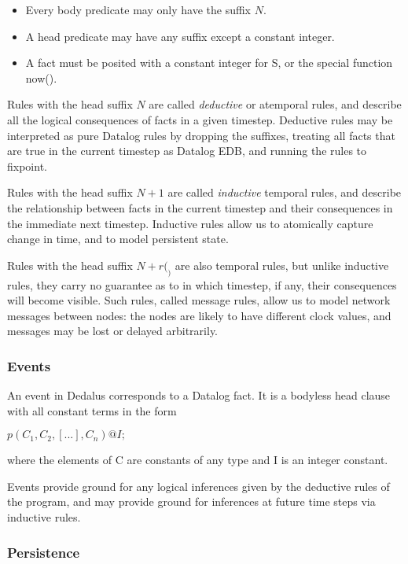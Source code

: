 \begin{itemize}
\item Every body predicate may only have the suffix $N$.
\item A head predicate may have any suffix except a constant integer.
\item A fact must be posited with a constant integer for S, or the special function now().
\end{itemize}
Rules with the head suffix $N$ are called \emph{deductive} or atemporal rules, and describe all the logical consequences of facts in a given 
timestep. Deductive rules may be interpreted as pure Datalog rules by dropping the suffixes, treating all facts that are true in the current 
timestep as Datalog EDB, and running the rules to fixpoint.

Rules with the head suffix $N + 1$ are called \emph{inductive} temporal rules, and describe the relationship between facts in the current timestep 
and their consequences in the immediate next timestep. Inductive rules allow us to atomically capture change in time, and to model persistent state.

Rules with the head suffix $N+r(_)$ are also temporal rules, but unlike inductive rules, they carry no guarantee as to in which timestep, if any, 
their consequences will become visible. Such rules, called message rules, allow us to model network messages between nodes: the nodes 
are likely to have different clock values, and messages may be lost or delayed arbitrarily.

\subsubsection{Events}

An event in Dedalus corresponds to a Datalog fact.  It is a bodyless head clause with all constant terms in the form


$p(C_{1},C_{2},[...],C_{n})@I;$


where the elements of C are constants of any type and I is an integer constant.

Events provide ground for any logical inferences given by the deductive rules of the program, and may provide ground for inferences at 
future time steps via inductive rules.

\subsubsection{Persistence}

